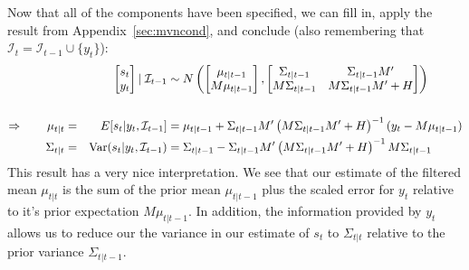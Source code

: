 \documentclass[a4paper,12pt]{article}
\begin{document}
Now that all of the components have been specified, we can fill in,
apply the result from Appendix~\ref{sec:mvncond}, and conclude (also
remembering that $\mathcal{I}_{t}=\mathcal{I}_{t-1} \cup \{y_t\}$):
\begin{alignat}{3}
  &&\begin{bmatrix} s_t \\ y_t \end{bmatrix} | \;
  \mathcal{I}_{t-1}
  &\sim
  N\left(\begin{bmatrix} \mu_{t|t-1} \\ M\mu_{t|t-1}
    \end{bmatrix},
  \begin{bmatrix}
    \Sigma_{t|t-1} & \Sigma_{t|t-1} M'
    \notag\\
    M\Sigma_{t|t-1} & M\Sigma_{t|t-1}M' + H
  \end{bmatrix}
  \right) \notag\\\label{normfilt}\\
  \Rightarrow \qquad
  \mu_{t|t} =&& E[s_t|y_t, \mathcal{I}_{t-1}]
    &= \mu_{t|t-1} + \Sigma_{t|t-1} M'
    \left(M\Sigma_{t|t-1}M' + H\right)^{-1} (y_t-M\mu_{t|t-1}) \notag\\
  \Sigma_{t|t} =&&
    \text{Var}(s_t|y_t, \mathcal{I}_{t-1})
    &= \Sigma_{t|t-1} - \Sigma_{t|t-1}M'
    \left(M\Sigma_{t|t-1}M' + H\right)^{-1} M\Sigma_{t|t-1} \notag
\end{alignat}
This result has a very nice interpretation. We see that our estimate of
the filtered mean $\mu_{t|t}$ is the sum of the prior mean $\mu_{t|t-1}$
plus the scaled error for $y_t$ relative to it's prior expectation
$M\mu_{t|t-1}$.  In addition, the information provided by $y_t$ allows
us to reduce our the variance in our estimate of $s_t$ to $\Sigma_{t|t}$
relative to the prior variance $\Sigma_{t|t-1}$.
\end{document}
